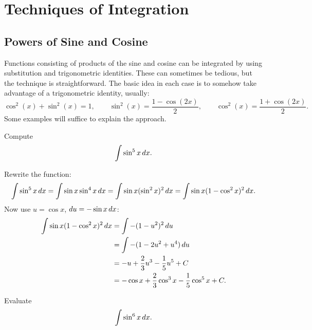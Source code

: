\chapter{Techniques of Integration}

\section{Powers of Sine and Cosine}


Functions consisting of products of the sine and cosine can be
integrated by using substitution and trigonometric identities. These
can sometimes be tedious, but the technique is straightforward. The
basic idea in each case is to somehow take advantage of a
trigonometric identity, usually:
\[
\cos^2(x) + \sin^2(x) = 1, \qquad \sin^2(x) = \frac{1-\cos(2x)}{2}, \qquad \cos^2(x)= \frac{1+\cos(2x)}{2}.
\]
Some examples will suffice to explain the approach.

\begin{example}
Compute
\[\int \sin^5 x\, d x.
\]
\end{example}

\begin{solution}
Rewrite the function:
$$
  \int \sin^5 x\, d x=\int \sin x \sin^4 x\, d x=
  \int \sin x (\sin^2 x)^2\, d x=
  \int \sin x (1-\cos^2 x)^2\, d x.
$$
Now use $u=\cos x$, $du=-\sin x\, d x$:
\begin{align*}
  \int \sin x (1-\cos^2 x)^2\, d x&=\int -(1-u^2)^2\, d u \\
  &=\int -(1-2u^2+u^4)\, d u \\
  &=-u+{2\over3}u^3-{1\over5}u^5+C \\
  &=-\cos x+{2\over3}\cos^3 x-{1\over5}\cos^5x+C. 
\end{align*}
\end{solution}

\begin{example}
Evaluate 
\[
\int \sin^6 x\, d x.
\]
\end{example}

